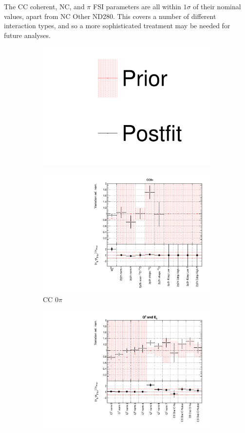The CC coherent, NC, and $\pi$ FSI parameters are all within $1\sigma$ of their nominal values, apart from NC Other ND280. This covers a number of different interaction types, and so a more sophisticated treatment may be needed for future analyses. 

\begin{figure}[!htbp]
\centering
\begin{subfigure}{0.95\textwidth}
  \centering
  \includegraphics[width=0.25\linewidth]{figs/dat_leg}
\end{subfigure}
\begin{subfigure}{0.49\textwidth}
  \centering
  \includegraphics[width=0.9\linewidth]{figs/datxsec1}
  \caption{CC 0$\pi$}
\end{subfigure}
\begin{subfigure}{0.49\textwidth}
  \centering
  \includegraphics[width=0.9\linewidth]{figs/datxsec2}

\end{subfigure}
\end{figure}
